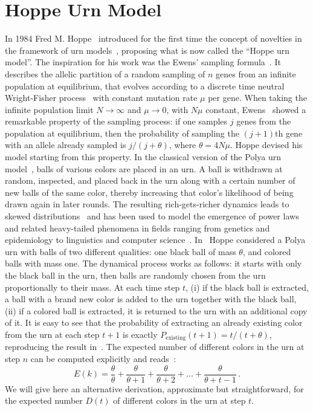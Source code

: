 \documentclass[graybox]{svmult}
\begin{document}
\section{Hoppe Urn Model}
\label{sec:fra_hoppe}
In 1984 Fred M. Hoppe~\cite{Hoppe_1984} introduced for the
first time the
concept of novelties in the framework of urn models~\cite{polya_1930,johnson1977urn,mahmoud_polya}, proposing what
is now called the ``Hoppe urn model''. 
The inspiration for his work
was the Ewens' sampling formula~\cite{Ewens_1972}. It describes the
 allelic partition of a random sampling of $n$ genes from an infinite
 population at equilibrium, that evolves according to a discrete time
 neutral Wright-Fisher process~\cite{fisher1930,wright1931evolution} with
 constant mutation rate $\mu$ per gene. When taking the infinite
 population limit $N \rightarrow \infty$ and $\mu \rightarrow 0$, with
 $N\mu$ constant, Ewens~\cite{Ewens_1972} showed a remarkable property
 of the sampling process: if one samples $j$ genes from the population
 at equilibrium, then the probability of sampling the $( j+1)$th gene
 with an allele already sampled is $j/( j+\theta)$, where $\theta =
 4N\mu$. 
Hoppe devised his model starting from this property. 
In the classical version of the Polya urn model~\cite{polya_1930}, balls of various colors are placed in an urn. A ball is withdrawn at random, inspected, and placed back in the urn along with a certain number of new balls of the same color, thereby increasing that color's likelihood of being drawn again in later rounds. The resulting rich-gets-richer dynamics leads to skewed distributions~\cite{simon-mandel-dispute,Yule_1925} and has been used to model the emergence of power laws and related heavy-tailed phenomena in fields ranging from genetics and epidemiology to linguistics and computer science~\cite{simkin2011,Mitzenmacher_2003,newman_2005}. 
In~\cite{Hoppe_1984,Hoppe_1987}  Hoppe  considered a Polya urn with
balls of two different qualities: one black ball of mass $\theta$, and
colored balls with mass one. The dynamical process works as
follows: 
it starts with only the black ball in the urn, then balls are
randomly chosen from the urn proportionally to their mass.
 At each time step $t$,
(i) if the black ball is extracted, a ball with a brand new color is
added to the urn together with the black ball, 
(ii) if a colored ball is extracted, it is returned
to the urn with an additional copy of it. 
It is easy to see that the probability of extracting an already existing color from the urn at each step $t +1$ is exactly $P_\mathrm{existing}(t +1) = t/(t +\theta)$, reproducing the result in~\cite{Ewens_1972}. The expected number of different colors in the urn at step $n$ can be computed explicitly and reads~\cite{Hoppe_1984,Hoppe_1987}:
%
\begin{equation}\label{eq:hoppe_exact}
E(k) = \frac{\theta}{\theta}+   \frac{\theta}{\theta+1}+
\frac{\theta}{\theta+2} + ... +  \frac{\theta}{\theta+t-1} \,.
\end{equation}
%
We will give here an alternative derivation, approximate but
straightforward, for the expected number $D(t)$ of different colors
in the urn at step $t$.
\end{document}

